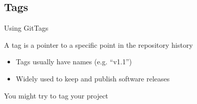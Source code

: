 \documentclass[10pt,compress]{beamer} %
\begin{document}
\subsection{Tags}
\begin{frame}{Using Git}{Tags}

A tag is a pointer to a specific point in the repository history
\begin{itemize}
	\item Tags usually have names (e.g. ``v1.1'')
 \item Widely used to keep and publish software releases
\end{itemize}

You might try to tag your project

\end{frame}










\end{document}
